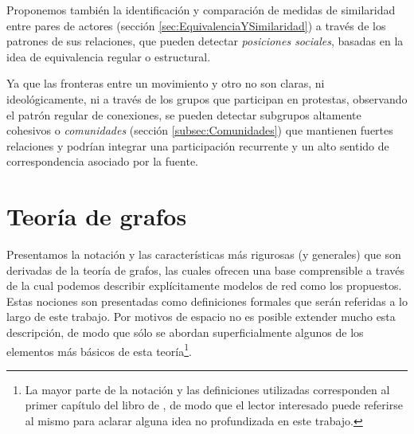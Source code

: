 \documentclass[letterpaper, 11pt]{book}
\theoremstyle{definition}
\theoremstyle{remark}
\begin{document}
Proponemos también la identificación y comparación de medidas de similaridad entre pares de actores (sección \ref{sec:EquivalenciaYSimilaridad}) a través de los patrones de sus relaciones, que pueden detectar \emph{posiciones sociales}, basadas en la idea de equivalencia regular o estructural. 


Ya que las fronteras entre un movimiento y otro no son claras, ni ideológicamente, ni a través de los grupos que participan en protestas, observando el patrón regular de conexiones, se pueden detectar subgrupos altamente cohesivos o \emph{comunidades} (sección \ref{subsec:Comunidades}) que mantienen fuertes relaciones y podrían integrar una participación recurrente y un alto sentido de correspondencia asociado por la fuente. 






\section{Teoría de grafos}
\label{sec:MetricasGrafos}


Presentamos la notación y las características más rigurosas (y generales) que son derivadas de la teoría de grafos, las cuales ofrecen una base comprensible a través de la cual podemos describir explícitamente modelos de red como los propuestos. 
Estas nociones son presentadas como definiciones formales que serán referidas a lo largo de este trabajo. 
Por motivos de espacio no es posible extender mucho esta descripción, de modo que sólo se abordan superficialmente algunos de los elementos más básicos de esta teoría\footnote{
    La mayor parte de la notación y las definiciones utilizadas corresponden al primer capítulo del libro de \citet{2005_Diestel_GraphThery}, de modo que el lector interesado puede referirse al mismo para aclarar alguna idea no profundizada en este trabajo.
}.
\end{document}
